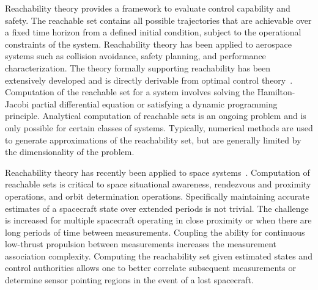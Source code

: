 Reachability theory provides a framework to evaluate control capability and safety.  
The reachable set contains all possible trajectories that are achievable over a fixed time horizon from a defined initial condition, subject to the operational constraints of the system.
Reachability theory has been applied to aerospace systems such as collision avoidance, safety planning, and performance characterization.
The theory formally supporting reachability has been extensively developed and is directly derivable from optimal control theory~\cite{varaiya2000,lygeros2002,lygeros2004}.
Computation of the reachable set for a system involves solving the Hamilton-Jacobi partial differential equation or satisfying a dynamic programming principle.
Analytical computation of reachable sets is an ongoing problem and is only possible for certain classes of systems.
Typically, numerical methods are used to generate approximations of the reachability set, but are generally limited by the dimensionality of the problem.
 
Reachability theory has recently been applied to space systems~\cite{holzinger2009,komendera2012a}.
Computation of reachable sets is critical to space situational awareness, rendezvous and proximity operations, and orbit determination operations.
Specifically maintaining accurate estimates of a spacecraft state over extended periods is not trivial.
The challenge is increased for multiple spacecraft operating in close proximity or when there are long periods of time between measurements.
Coupling the ability for continuous low-thrust propulsion between measurements increases the measurement association complexity.
Computing the reachability set given estimated states and control authorities allows one to better correlate subsequent measurements or determine sensor pointing regions in the event of a lost spacecraft. 

